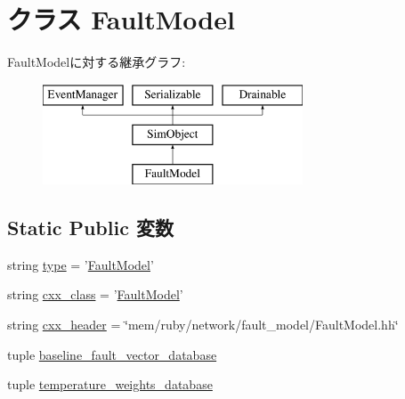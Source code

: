 \hypertarget{classFaultModel_1_1FaultModel}{
\section{クラス FaultModel}
\label{classFaultModel_1_1FaultModel}
}
FaultModelに対する継承グラフ:\begin{figure}[H]
\begin{center}
\leavevmode
\includegraphics[height=3cm]{classFaultModel_1_1FaultModel}
\end{center}
\end{figure}
\subsection*{Static Public 変数}
\begin{DoxyCompactItemize}
\item 
string \hyperlink{classFaultModel_1_1FaultModel_acce15679d830831b0bbe8ebc2a60b2ca}{type} = '\hyperlink{classFaultModel_1_1FaultModel}{FaultModel}'
\item 
string \hyperlink{classFaultModel_1_1FaultModel_a58cd55cd4023648e138237cfc0822ae3}{cxx\_\-class} = '\hyperlink{classFaultModel_1_1FaultModel}{FaultModel}'
\item 
string \hyperlink{classFaultModel_1_1FaultModel_a17da7064bc5c518791f0c891eff05fda}{cxx\_\-header} = \char`\"{}mem/ruby/network/fault\_\-model/FaultModel.hh\char`\"{}
\item 
tuple \hyperlink{classFaultModel_1_1FaultModel_a1c04665e955c1f1ef98a94f0573b23c7}{baseline\_\-fault\_\-vector\_\-database}
\item 
tuple \hyperlink{classFaultModel_1_1FaultModel_a8dd936ea2844d2542ab577d434526255}{temperature\_\-weights\_\-database}
\end{DoxyCompactItemize}


